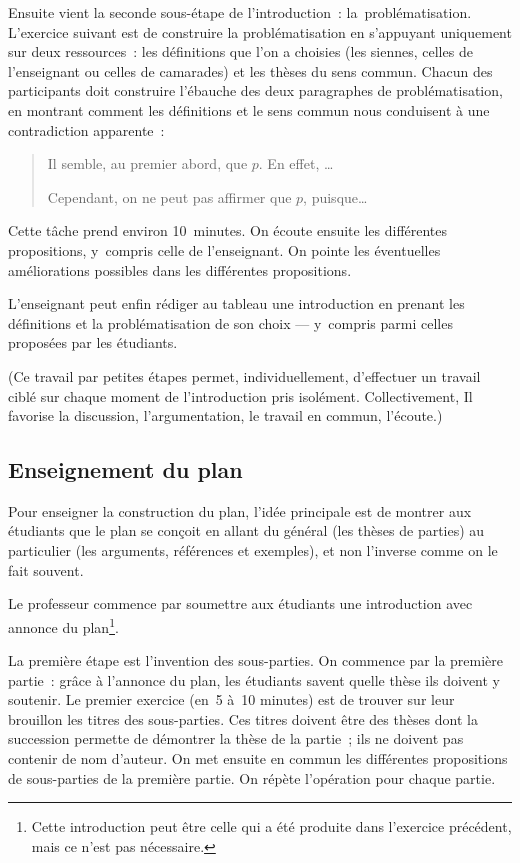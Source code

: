 \documentclass[a4paper,12pt]{article}
\begin{document}
Ensuite vient la seconde sous-étape de l'introduction :
la problématisation. L'exercice suivant est de construire la
problématisation en s'appuyant uniquement sur deux ressources : les
définitions que l'on a choisies (les siennes, celles de l'enseignant ou
celles de camarades) et les thèses du sens commun. Chacun des
participants doit construire l'ébauche des deux paragraphes de
problématisation, en montrant comment les définitions et le sens commun
nous conduisent à une contradiction apparente :
\begin{quote}
Il semble, au premier abord, que \(p\). En effet, \ldots{}

Cependant, on ne peut pas affirmer que \(p\), puisque\ldots{}
\end{quote}
Cette tâche prend environ 10 minutes. On écoute ensuite les différentes
propositions, y compris celle de l'enseignant. On pointe les éventuelles
améliorations possibles dans les différentes propositions.

L'enseignant peut enfin rédiger au tableau une introduction en prenant
les définitions et la problématisation de son choix — y compris parmi
celles proposées par les étudiants.

(Ce travail par petites étapes permet, individuellement, d'effectuer un
travail ciblé sur chaque moment de l'introduction pris isolément.
Collectivement, Il favorise la discussion, l'argumentation, le travail
en commun, l'écoute.)


\subsection{Enseignement du plan}
\label{sec:org342fb24}

Pour enseigner la construction du plan, l'idée principale est de montrer
aux étudiants que le plan se conçoit en allant du général (les thèses de
parties) au particulier (les arguments, références et exemples), et non
l'inverse comme on le fait souvent.

Le professeur commence par soumettre aux étudiants une introduction avec
annonce du plan\footnote{Cette introduction peut être celle qui a été produite dans
l'exercice précédent, mais ce n'est pas nécessaire.}. 

La première étape est l'invention des sous-parties. On commence par la
première partie : grâce à l'annonce du plan, les étudiants savent quelle
thèse ils doivent y soutenir. Le premier exercice (en 5 à 10 minutes)
est de trouver sur leur brouillon les titres des sous-parties. Ces
titres doivent être des thèses dont la succession permette de démontrer
la thèse de la partie ; ils ne doivent pas contenir de nom d'auteur. On
met ensuite en commun les différentes propositions de sous-parties de la
première partie. On répète l'opération pour chaque partie.
\end{document}
